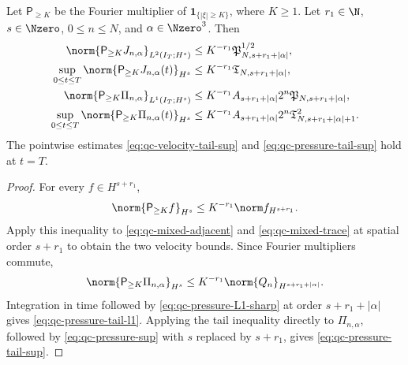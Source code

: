 \begin{proposition}
\label{prop:qc-frequency-tails}
Let \(\mathsf P_{\ge K}\) be the Fourier multiplier of
\(\mathbf 1_{\{|\xi|\ge K\}}\), where \(K\ge1\).  Let
\(r_1\in\N\), \(s\in\Nzero\), \(0\le n\le N\), and
\(\alpha\in\Nzero^3\).  Then
\begin{align}
 \norm{\mathsf P_{\ge K}J_{n,\alpha}}_{L^2(I_T;H^s)}
 &\le K^{-r_1}\mathfrak P_{N,s+r_1+|\alpha|}^{1/2},
 \label{eq:qc-velocity-tail-l2}\\
 \sup_{0\le t\le T}
 \norm{\mathsf P_{\ge K}J_{n,\alpha}(t)}_{H^s}
 &\le K^{-r_1}\mathfrak T_{N,s+r_1+|\alpha|},
 \label{eq:qc-velocity-tail-sup}\\
 \norm{\mathsf P_{\ge K}\Pi_{n,\alpha}}_{L^1(I_T;H^s)}
 &\le K^{-r_1}A_{s+r_1+|\alpha|}2^n
 \mathfrak P_{N,s+r_1+|\alpha|},
 \label{eq:qc-pressure-tail-l1}\\
 \sup_{0\le t\le T}
 \norm{\mathsf P_{\ge K}\Pi_{n,\alpha}(t)}_{H^s}
 &\le K^{-r_1}A_{s+r_1+|\alpha|}2^n
 \mathfrak T_{N,s+r_1+|\alpha|+1}^2.
 \label{eq:qc-pressure-tail-sup}
\end{align}
The pointwise estimates \eqref{eq:qc-velocity-tail-sup} and
\eqref{eq:qc-pressure-tail-sup} hold at \(t=T\).
\end{proposition}

\begin{proof}
For every \(f\in H^{s+r_1}\),
\[
 \norm{\mathsf P_{\ge K}f}_{H^s}
 \le K^{-r_1}\norm f_{H^{s+r_1}}.
\]
Apply this inequality to
\eqref{eq:qc-mixed-adjacent} and \eqref{eq:qc-mixed-trace} at spatial order
\(s+r_1\) to obtain the two velocity bounds.  Since Fourier multipliers
commute,
\[
 \norm{\mathsf P_{\ge K}\Pi_{n,\alpha}}_{H^s}
 \le K^{-r_1}\norm{Q_n}_{H^{s+r_1+|\alpha|}}.
\]
Integration in time followed by
\eqref{eq:qc-pressure-L1-sharp} at order \(s+r_1+|\alpha|\) gives
\eqref{eq:qc-pressure-tail-l1}.  Applying the tail inequality directly to
\(\Pi_{n,\alpha}\), followed by \eqref{eq:qc-pressure-sup} with \(s\) replaced
by \(s+r_1\), gives \eqref{eq:qc-pressure-tail-sup}.
\end{proof}

